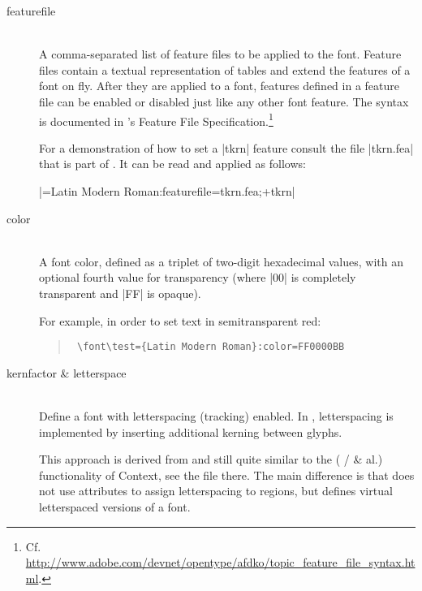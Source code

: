\begin{description}
\item [featurefile] \hfill \\
       A comma-separated list of feature files to be applied to the
       font.
       Feature files contain a textual representation of
       \OpenType tables and extend the features of a font
       on fly.
       After they are applied to a font, features defined in a
       feature file can be enabled or disabled just like any
       other font feature.
       The syntax is documented in ’s
       \OpenType Feature File Specification.\footnote{%
         Cf. \url{http://www.adobe.com/devnet/opentype/afdko/topic_feature_file_syntax.html}.
       }

       For a demonstration of how to set a |tkrn| feature consult
       the file |tkrn.fea| that is part of .
       It can be read and applied as follows:

       |\font\test=Latin Modern Roman:featurefile=tkrn.fea;+tkrn|

\item [color] \hfill \\
       A font color, defined as a triplet of two-digit hexadecimal
        values, with an optional fourth value for
       transparency
       (where |00| is completely transparent and |FF| is opaque).

       For example, in order to set text in semitransparent red:

       \begin{quote}
          \begin{verbatim}
 \font\test={Latin Modern Roman}:color=FF0000BB
          \end{verbatim}
       \end{quote}

\item [kernfactor \& letterspace] \hfill \\
       Define a font with letterspacing (tracking) enabled.
       In , letterspacing is implemented by
       inserting additional kerning between glyphs.

       This approach is derived from and still quite similar to the
        ( /
        \& al.) functionality of
       Context, see the file  there.
       The main difference is that  does not
       use \LUATEX attributes to assign letterspacing to regions,
       but defines virtual letterspaced versions of a font.


\end{description}

